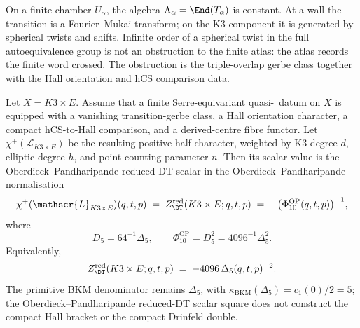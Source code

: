 \begin{remark}
\label{rem:cy-c-beyond-wall-crossing-intertwining}
On a finite chamber $U_\alpha$, the algebra
$\Lambda_\alpha=\End(T_\alpha)$ is constant. At a wall the transition
is a Fourier--Mukai transform; on the K3 component it is generated by
spherical twists and shifts. Infinite order of a spherical twist in
the full autoequivalence group is not an obstruction to the finite
atlas: the atlas records the finite word crossed. The
obstruction is the triple-overlap gerbe class together with the Hall
orientation and hCS comparison data.
\end{remark}

\begin{proposition}
\label{thm:cy-c-beyond-k3e-quasi-nccr-positive-half-character}
Let $X=K3\times E$. Assume that a finite Serre-equivariant
quasi-\NCCR\ datum on $X$ is equipped with a vanishing transition-gerbe
class, a Hall orientation character, a compact hCS-to-Hall comparison,
and a derived-centre fibre functor. Let
$\chi^{+}(\mathscr{L}_{K3 \times E})$ be the resulting positive-half
character, weighted by K3 degree $d$, elliptic degree $h$, and
point-counting parameter $n$. Then its scalar value is the
Oberdieck--Pandharipande reduced DT scalar in the Oberdieck--Pandharipande normalisation
\[
 \chi^{+}(\mathscr{L}_{K3 \times E})(q,t,p)
 \;=\;
 Z^{\mathrm{red}}_{\DT}(K3\times E;q,t,p)
 \;=\;
 -\bigl(\Phi_{10}^{\mathrm{OP}}(q,t,p)\bigr)^{-1},
\]
where
\[
 D_5=64^{-1}\Delta_5,\qquad
 \Phi_{10}^{\mathrm{OP}}=D_5^2=4096^{-1}\Delta_5^2.
\]
Equivalently,
\[
 Z^{\mathrm{red}}_{\DT}(K3\times E;q,t,p)
 \;=\;
 -4096\,\Delta_5(q,t,p)^{-2}.
\]
The primitive BKM denominator remains $\Delta_5$, with
$\kappa_{\mathrm{BKM}}(\Delta_5)=c_1(0)/2=5$; the Oberdieck--Pandharipande reduced-DT scalar square
does not construct the compact Hall bracket or the compact Drinfeld
double.
\end{proposition}

